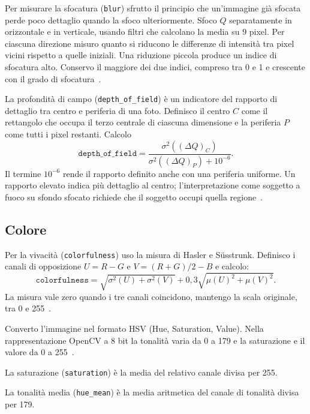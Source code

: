 Per misurare la sfocatura (\texttt{blur}) sfrutto il principio che un'immagine già sfocata perde poco dettaglio quando la sfoco ulteriormente. Sfoco $Q$ separatamente in orizzontale e in verticale, usando filtri che calcolano la media su 9 pixel. Per ciascuna direzione misuro quanto si riducono le differenze di intensità tra pixel vicini rispetto a quelle iniziali. Una riduzione piccola produce un indice di sfocatura alto. Conservo il maggiore dei due indici, compreso tra 0 e 1 e crescente con il grado di sfocatura~\cite{creteroffet:hal-00232709}.

La profondità di campo (\texttt{depth\_of\_field}) è un indicatore del rapporto di dettaglio tra centro e periferia di una foto. Definisco il centro $C$ come il rettangolo che occupa il terzo centrale di ciascuna dimensione e la periferia $P$ come tutti i pixel restanti. Calcolo
\begin{equation}
    \texttt{depth\_of\_field}=
    \frac{\sigma^2((\Delta Q)_C)}{\sigma^2((\Delta Q)_P)+10^{-6}}.
\end{equation}
Il termine $10^{-6}$ rende il rapporto definito anche con una periferia uniforme. Un rapporto elevato indica più dettaglio al centro; l'interpretazione come soggetto a fuoco su sfondo sfocato richiede che il soggetto occupi quella regione~\cite{10.1007/11744078_23}.

\subsection{Colore}
\label{subsec:feature-colore}

Per la vivacità (\texttt{colorfulness}) uso la misura di Hasler e Süsstrunk. Definisco i canali di opposizione $U=R-G$ e $V=(R+G)/2-B$ e calcolo:
\begin{equation}
    \texttt{colorfulness}=
    \sqrt{\sigma^2(U)+\sigma^2(V)}+
    0{,}3\sqrt{\mu(U)^2+\mu(V)^2}.
\end{equation}
La misura vale zero quando i tre canali coincidono, mantengo la scala originale, tra 0 e 255~\cite{10.1117/12.477378}.

Converto l'immagine nel formato HSV (Hue, Saturation, Value). Nella rappresentazione OpenCV a 8 bit la tonalità varia da 0 a 179 e la saturazione e il valore da 0 a 255~\cite{opencv_library}.

La saturazione (\texttt{saturation}) è la media del relativo canale divisa per 255.

La tonalità media (\texttt{hue\_mean}) è la media aritmetica del canale di tonalità divisa per 179.

